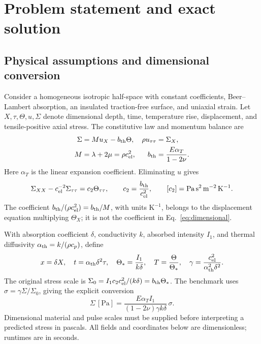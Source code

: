 \documentclass[11pt]{article}
\begin{document}
\section{Problem statement and exact solution}

\subsection{Physical assumptions and dimensional conversion}

Consider a homogeneous isotropic half-space with constant coefficients,
Beer--Lambert absorption, an insulated traction-free surface, and
uniaxial strain. Let $X,\tau,\Theta,u,\Sigma$ denote dimensional depth,
time, temperature rise, displacement, and tensile-positive axial stress.
The constitutive law and momentum balance are \citep{WangXu2001}
\begin{align}
 \Sigma&=M u_X-b_{\rm th}\Theta,&
 \rho u_{\tau\tau}&=\Sigma_X,\\
 M&=\lambda+2\mu=\rho c_{\rm el}^2,&
 b_{\rm th}&=\frac{E\alpha_T}{1-2\nu}.
\end{align}
Here $\alpha_T$ is the linear expansion coefficient. Eliminating $u$ gives
\begin{equation}
 \Sigma_{XX}-c_{\rm el}^{-2}\Sigma_{\tau\tau}
 =c_2\Theta_{\tau\tau},\qquad
 c_2=\frac{b_{\rm th}}{c_{\rm el}^2},\qquad
 [c_2]=\mathrm{Pa\,s^2\,m^{-2}\,K^{-1}}.
 \label{eq:dimensional}
\end{equation}
The coefficient $b_{\rm th}/(\rho c_{\rm el}^2)=b_{\rm th}/M$, with units
$\mathrm{K^{-1}}$, belongs to the displacement equation multiplying
$\Theta_X$; it is not the coefficient in Eq.~\eqref{eq:dimensional}.

With absorption coefficient $\delta$, conductivity $k$, absorbed intensity
$I_1$, and thermal diffusivity $\alpha_{\rm th}=k/(\rho c_p)$, define
\begin{equation}
 x=\delta X,\quad t=\alpha_{\rm th}\delta^2\tau,\quad
 \Theta_*=\frac{I_1}{k\delta},\quad T=\frac{\Theta}{\Theta_*},\quad
 \gamma=\frac{c_{\rm el}^2}{\alpha_{\rm th}^2\delta^2}.
\end{equation}
The original stress scale is
$\Sigma_0=I_1c_2c_{\rm el}^2/(k\delta)=b_{\rm th}\Theta_*$.
The benchmark uses $\sigma=\gamma\Sigma/\Sigma_0$, giving the explicit
conversion
\begin{equation}
 \boxed{\Sigma\,[\mathrm{Pa}]=
 \frac{E\alpha_T I_1}{(1-2\nu)\gamma k\delta}\,\sigma .}
 \label{eq:pascal}
\end{equation}
Dimensional material and pulse scales must be supplied before interpreting
a predicted stress in pascals. All fields and coordinates below are
dimensionless; runtimes are in seconds.
\end{document}
